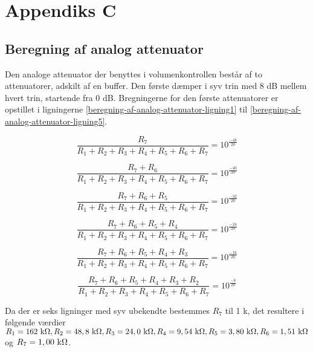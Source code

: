 \chapter{Appendiks C}
\label{beregning-af-analog-attenuator}
\section*{Beregning af analog attenuator}

Den analoge attenuator der benyttes i volumenkontrollen består af to attenuatorer, adskilt af en buffer. Den første dæmper i syv trin med 8 dB mellem hvert trin, startende fra 0 dB. Bregningerne for den første attenuatorer er opstillet i ligningerne \ref{beregning-af-analog-attenuator-ligning1} til \ref{beregning-af-analog-attenuator-ligning5}.

\begin{equation}
\label{beregning-af-analog-attenuator-ligning1}
\frac{R_7}{R_1 + R_2 + R_3 + R_4 + R_5 + R_6 + R_7} = 10^{\frac{-48}{20}}
\end{equation}

\begin{equation}
\frac{R_7 + R_6}{R_1 + R_2 + R_3 + R_4 + R_5 + R_6 + R_7} = 10^{\frac{-40}{20}}
\end{equation}

\begin{equation}
\frac{R_7 + R_6 + R_5}{R_1 + R_2 + R_3 + R_4 + R_5 + R_6 + R_7} = 10^{\frac{-32}{20}}
\end{equation}

\begin{equation}
\frac{R_7 + R_6 + R_5 + R_4}{R_1 + R_2 + R_3 + R_4 + R_5 + R_6 + R_7} = 10^{\frac{-24}{20}}
\end{equation}

\begin{equation}
\frac{R_7 + R_6 + R_5 + R_4 + R_3}{R_1 + R_2 + R_3 + R_4 + R_5 + R_6 + R_7} = 10^{\frac{-16}{20}}
\end{equation}

\begin{equation}
\label{beregning-af-analog-attenuator-ligning5}
\frac{R_7 + R_6 + R_5 + R_4 + R_3 + R_2}{R_1 + R_2 + R_3 + R_4 + R_5 + R_6 + R_7} = 10^{\frac{-8}{20}}
\end{equation}

Da der er seks ligninger med syv ubekendte bestemmes $R_7$ til 1 k\ohm, det resultere i følgende værdier 
$R_1 = 162 ~\mathrm{k}\ohm, R_2 = 48,8 ~\mathrm{k}\ohm, R_3 = 24,0 ~\mathrm{k}\ohm, R_4 = 9,54 ~\mathrm{k}\ohm, R_5 = 3,80  ~\mathrm{k}\ohm, R_6 = 1,51 ~\mathrm{k}\ohm$ og $R_7 = 1,00 ~\mathrm{k}\ohm$.

